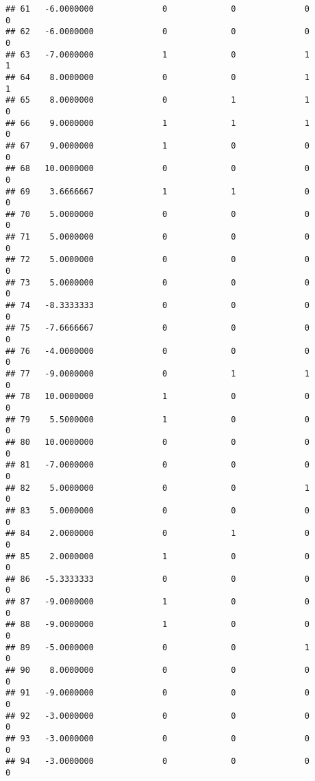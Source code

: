 \documentclass[
]{article}
\begin{document}
\begin{verbatim}
## 61   -6.0000000              0             0              0             0
## 62   -6.0000000              0             0              0             0
## 63   -7.0000000              1             0              1             1
## 64    8.0000000              0             0              1             1
## 65    8.0000000              0             1              1             0
## 66    9.0000000              1             1              1             0
## 67    9.0000000              1             0              0             0
## 68   10.0000000              0             0              0             0
## 69    3.6666667              1             1              0             0
## 70    5.0000000              0             0              0             0
## 71    5.0000000              0             0              0             0
## 72    5.0000000              0             0              0             0
## 73    5.0000000              0             0              0             0
## 74   -8.3333333              0             0              0             0
## 75   -7.6666667              0             0              0             0
## 76   -4.0000000              0             0              0             0
## 77   -9.0000000              0             1              1             0
## 78   10.0000000              1             0              0             0
## 79    5.5000000              1             0              0             0
## 80   10.0000000              0             0              0             0
## 81   -7.0000000              0             0              0             0
## 82    5.0000000              0             0              1             0
## 83    5.0000000              0             0              0             0
## 84    2.0000000              0             1              0             0
## 85    2.0000000              1             0              0             0
## 86   -5.3333333              0             0              0             0
## 87   -9.0000000              1             0              0             0
## 88   -9.0000000              1             0              0             0
## 89   -5.0000000              0             0              1             0
## 90    8.0000000              0             0              0             0
## 91   -9.0000000              0             0              0             0
## 92   -3.0000000              0             0              0             0
## 93   -3.0000000              0             0              0             0
## 94   -3.0000000              0             0              0             0

\end{verbatim}
\end{document}
